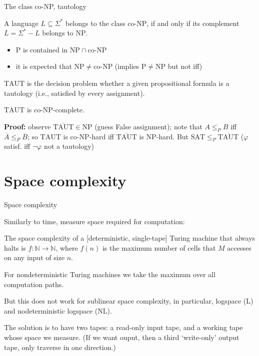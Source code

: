 \documentclass[handout]{beamer}
\begin{document}
\begin{frame}{The class co-NP, tautology}
    \begin{definition}
     A language $L\subseteq \Sigma^*$ belongs to the class \alert{co-$\mathrm{NP}$}, if and only if its complement $\overline{L}=\Sigma^*-L$ belongs to $\mathrm{NP}$.
    \end{definition}
    \vspace{-12pt}
    \begin{itemize}
        \item $\mathrm{P}$ is contained in $\mathrm{NP}\cap\text{co-}\mathrm{NP}$
        \item it is expected that $\mathrm{NP}\neq\text{co-}\mathrm{NP}$ (implies $\mathrm{P}\neq\mathrm{NP}$ but not iff)
    \end{itemize}

    \begin{example}
        \alert{$\mathrm{TAUT}$} is the decision problem whether a given propositional formula is a tautology (i.e., satisfied by every assignment).
    \end{example}
    \begin{theorem}
        $\mathrm{TAUT}$ is co-$\mathrm{NP}$-complete.
    \end{theorem}
    \textbf{Proof:} observe $\overline{\mathrm{TAUT}}\in\mathrm{NP}$ (guess False assignment); note that $A\leq_P B$ iff $\overline{A}\leq_P\overline{B}$; so $\mathrm{TAUT}$ is co-$\mathrm{NP}$-hard iff $\overline{\mathrm{TAUT}}$ is $\mathrm{NP}$-hard. But $\mathrm{SAT}\leq_P\overline{\mathrm{TAUT}}$ ($\varphi$ satisf. iff $\neg\varphi$ not a tautology)\hfill\qedsymbol
\end{frame}


\section*{Space complexity}

    
\begin{frame}{Space complexity}

    Similarly to time, measure space required for computation:

    \begin{definition}
        The \alert{space complexity} of a [deterministic, single-tape] Turing machine that always halts is $f:\mathbb{N}\to \mathbb{N}$, where $f(n)$ is the maximum number of cells that $M$ accesses on any input of size $n$.

        For nondeterministic Turing machines we take the maximum over all computation paths.
    \end{definition}

    But this does not work for \alert{sublinear} space complexity, in particular, \alert{logspace} (\alert{$\mathrm{L}$}) and \alert{nodeterministic logspace} (\alert{$\mathrm{NL}$}).

    The solution is to have two tapes: a read-only input tape, and a working tape whose space we measure. (If we want ouput, then a third `write-only' output tape, only traverse in one direction.)

\end{frame}
    
\end{document}
